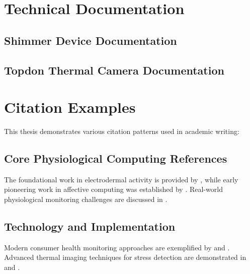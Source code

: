 \documentclass[12pt,a4paper]{report}
\begin{document}
\tableofcontents
\newpage

\listoffigures
\listoftables
\newpage















\appendix


\chapter{Technical Documentation}
\section{Shimmer Device Documentation}


\section{Topdon Thermal Camera Documentation}


\chapter*{Citation Examples}

This thesis demonstrates various citation patterns used in academic writing:

\section*{Core Physiological Computing References}
The foundational work in electrodermal activity is provided by \cite{Boucsein2012}, while early pioneering work in affective computing was established by \cite{Picard2001}. Real-world physiological monitoring challenges are discussed in \cite{Healey2005}.

\section*{Technology and Implementation}
Modern consumer health monitoring approaches are exemplified by \cite{AppleHealthWatch2019} and \cite{SamsungHealth2020}. Advanced thermal imaging techniques for stress detection are demonstrated in \cite{DriverStressThermal2020} and \cite{ContactlessStressThermal2022}.
\end{document}
